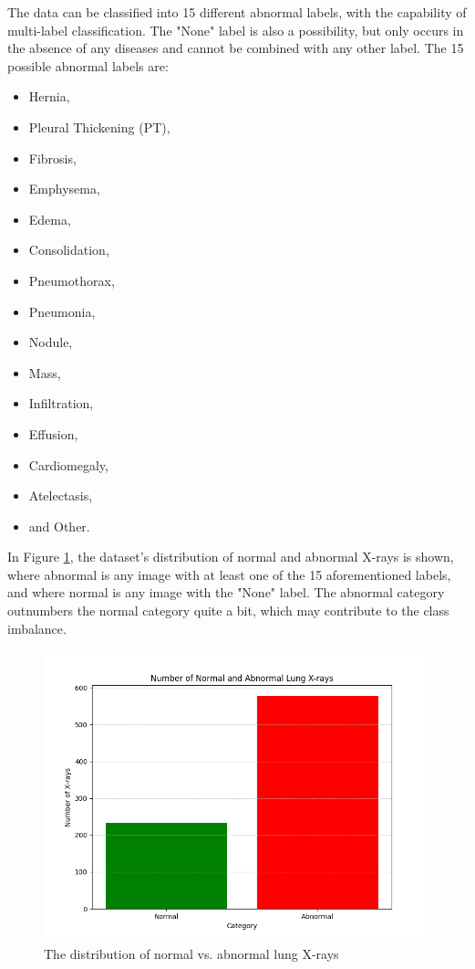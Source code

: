 \documentclass{article}
\theoremstyle{plain}
\theoremstyle{definition}
\theoremstyle{remark}
\begin{document}
The data can be classified into 15 different abnormal labels, with the capability of multi-label classification.
The "None" label is also a possibility, but only occurs in the absence of any diseases and cannot be
combined with any other label. The 15 possible abnormal labels are: 
\begin{itemize}
    \item Hernia,
    \item Pleural Thickening (PT),
    \item Fibrosis,
    \item Emphysema,
    \item Edema,
    \item Consolidation,
    \item Pneumothorax,
    \item Pneumonia,
    \item Nodule,
    \item Mass,
    \item Infiltration,
    \item Effusion,
    \item Cardiomegaly,
    \item Atelectasis,
    \item and Other.
\end{itemize}

In Figure \ref{fig:normalvabnormal}, the dataset's distribution of normal and abnormal X-rays is shown,
where abnormal is any image with at least one of the 15 aforementioned labels, and where
normal is any image with the "None" label. The abnormal category outnumbers the normal category quite
a bit, which may contribute to the class imbalance.

\begin{figure}[!h]
    \centering
    \includegraphics[scale=0.405]{normal_vs_abnormal}
    \caption{The distribution of normal vs. abnormal lung X-rays}
    \label{fig:normalvabnormal}
\end{figure}
\end{document}

